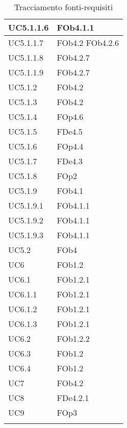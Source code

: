 \begin{longtable}{|l|p{4cm}|}
\hline
		UC5.1.1.6 & FOb4.1.1 \linebreak   \\
\hline
		UC5.1.1.7 & FOb4.2 \linebreak  FOb4.2.6 \linebreak   \\
\hline
		UC5.1.1.8 & FOb4.2.7 \linebreak   \\
\hline
		UC5.1.1.9 & FOb4.2.7 \linebreak   \\
\hline
		UC5.1.2 & FOb4.2 \linebreak   \\
\hline
		UC5.1.3 & FOb4.2 \linebreak   \\
\hline
		UC5.1.4 & FOp4.6 \linebreak   \\
\hline
		UC5.1.5 & FDe4.5 \linebreak   \\
\hline
		UC5.1.6 & FOp4.4 \linebreak   \\
\hline
		UC5.1.7 & FDe4.3 \linebreak   \\
\hline
		UC5.1.8 & FOp2 \linebreak   \\
\hline
		UC5.1.9 & FOb4.1 \linebreak   \\
\hline
		UC5.1.9.1 & FOb4.1.1 \linebreak   \\
\hline
		UC5.1.9.2 & FOb4.1.1 \linebreak   \\
\hline
		UC5.1.9.3 & FOb4.1.1 \linebreak   \\
\hline
		UC5.2 & FOb4 \linebreak   \\
\hline
		UC6 & FOb1.2 \linebreak   \\
\hline
		UC6.1 & FOb1.2.1 \linebreak   \\
\hline
		UC6.1.1 & FOb1.2.1 \linebreak   \\
\hline
		UC6.1.2 & FOb1.2.1 \linebreak   \\
\hline
		UC6.1.3 & FOb1.2.1 \linebreak   \\
\hline
		UC6.2 & FOb1.2.2 \linebreak   \\
\hline
		UC6.3 & FOb1.2 \linebreak   \\
\hline
		UC6.4 & FOb1.2 \linebreak   \\
\hline
		UC7 & FOb4.2 \linebreak   \\
\hline
		UC8 & FDe4.2.1 \linebreak   \\
\hline
		UC9 & FOp3 \linebreak   \\
\hline
\caption{Tracciamento fonti-requisiti}
\end{longtable}